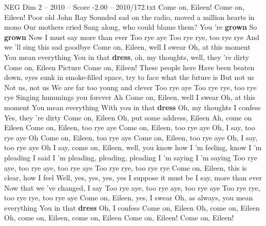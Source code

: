 \begin{textsample}{NEG Dim 2 – 2010 – Score -2.00 – 2010/172.txt}  \label{ex:f2_neg_019}
Come on, Eileen!
Come on, Eileen!
Poor old John Ray Sounded sad on the radio, moved a million hearts in mono Our mothers cried Sang along, who could blame them?
You 're \textbf{grown} So \textbf{grown} Now I must say more than ever Too rye aye Too rye rye, too rye rye And we 'll sing this sad goodbye Come on, Eileen, well I swear Oh, at this moment You mean everything You in that \textbf{dress}, oh, my thoughts, well, they 're dirty Come on, Eileen Picture Come on, Eileen!
These people here Have been beaten down, eyes sunk in smoke-filled space, try to face what the future is But not us Not us, not us We are far too young and clever Too rye aye Too rye rye, too rye rye Singing hummings you forever Ah Come on, Eileen, well I swear Oh, at this moment You mean everything With you in that \textbf{dress} Oh, my thoughts I confess Yes, they 're dirty Come on, Eileen Oh, put some address, Eileen Ah, come on Eileen Come on, Eileen, too rye aye Come on, Eileen, too rye aye Oh, I say, too rye aye Oh Come on, Eileen, too rye aye Come on, Eileen, too rye aye Oh, I say, too rye aye Oh I say, come on, Eileen, well, you know how I 'm feeling, know I 'm pleading I said I 'm pleading, pleading, pleading I 'm saying I 'm saying Too rye aye, too rye aye, too rye aye Too rye rye, too rye rye Come on, Eileen, this is clear, how I feel Well, yes, yes, yes, yes I suppose it must be I say, more than ever Now that we 've changed, I say Too rye aye, too rye aye, too rye aye Too rye rye, too rye rye, too rye aye Come on, Eileen, yes, I swear Oh, as always, you mean everything You in that \textbf{dress} Oh, I confess Come on, Eileen Oh, come on, Eileen Oh, come on, Eileen, come on, Eileen Come on, Eileen!
Come on, Eileen!

\end{textsample}
